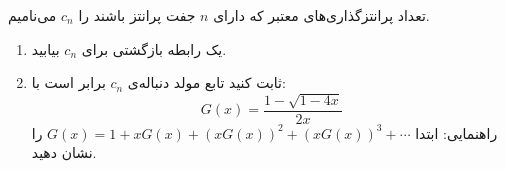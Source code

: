 \EXERCISE
تعداد پرانتزگذاری‌های معتبر که دارای
$n$
جفت پرانتز باشند را
$c_n$
می‌نامیم.
\begin{enumerate}
\item
یک رابطه بازگشتی برای
$c_n$
بیابید.
\item
ثابت کنید تابع مولد دنباله‌ی
$c_n$
برابر است با:
$$G(x) = \frac{1 - \sqrt{1 - 4x}}{2x}$$
راهنمایی: ابتدا
$G(x) = 1 + xG(x) + (xG(x))^2 + (xG(x))^3 + \cdots$
را نشان دهید.
\end{enumerate}